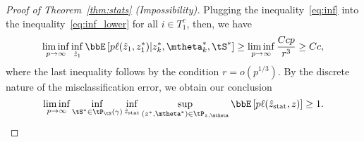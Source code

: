 \documentclass[lettersize,onecolumn,journal]{IEEEtran}
\theoremstyle{definition}
\theoremstyle{definition}
\begin{document}
{\begin{proof}[Proof of Theorem~\ref{thm:stats} (Impossibility)]
   Plugging the inequality~\eqref{eq:inf} into the inequality~\eqref{eq:inf_lower} for all $i \in T_1^c$, then, we have 
   \begin{equation}
       \liminf_{p \rightarrow \infty}  \inf_{\hat z_1 } \bbE \left[ p \ell(\hat z_1, z_1^*) | z^*_k, \mtheta^*_k, \tS^*  \right]  \geq \liminf_{p \rightarrow \infty} \frac{ C cp }{r^3} \geq C c,
   \end{equation}
   where the last inequality follows by the condition $r = o(p^{1/3})$. By the discrete nature of the misclassification error, we obtain our conclusion
   \begin{equation}
       \liminf_{p \rightarrow \infty} \inf_{\tS^* \in  \tP_{\tS}(\gamma)}  \inf_{\hat z_{\text{stat}} }\sup_{ (z^*, \mtheta^*) \in \tP_{z, \mtheta}} \bbE \left[ p\ell(\hat z_{\text{stat}}, z) \right]  \geq 1. 
   \end{equation}
   \end{proof}
}

   

\end{document}
